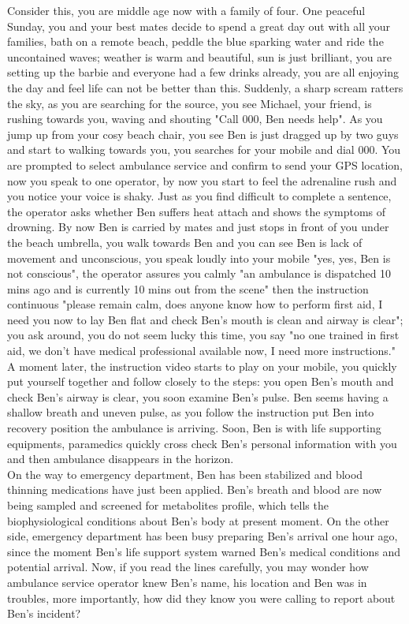 Consider this, you are middle age now with a family of four. One peaceful Sunday, you and your best mates decide to spend a great day out with all your families, bath on a remote beach, peddle the blue sparking water and ride the uncontained waves; weather is warm and beautiful, sun is just brilliant, you are setting up the barbie and everyone had a few drinks already, you are all enjoying the day and feel life can not be better than this. Suddenly, a sharp scream ratters the sky, as you are searching for the source, you see Michael, your friend, is rushing towards you, waving and shouting "Call 000, Ben needs help". As you jump up from your cosy beach chair, you see Ben is just dragged up by two guys and start to walking towards you, you searches for your mobile and dial 000. You are prompted to select ambulance service and confirm to send your GPS location, now you speak to one operator, by now you start to feel the adrenaline rush and you notice your voice is shaky. Just as you find difficult to complete a sentence, the operator asks whether Ben suffers heat attach and shows the symptoms of drowning. By now Ben is carried by mates and just stops in front of you under the beach umbrella, you walk towards Ben and you can see Ben is lack of movement and unconscious, you speak loudly into your mobile "yes, yes, Ben is not conscious", the operator assures you calmly "an ambulance is dispatched 10 mins ago and is currently 10 mins out from the scene" then the instruction continuous "please remain calm, does anyone know how to perform first aid, I need you now to lay Ben flat and check Ben's mouth is clean and airway is clear"; you ask around, you do not seem lucky this time, you say "no one trained in first aid, we don't have medical professional available now, I need more instructions." \\
A moment later, the instruction video starts to play on your mobile, you quickly put yourself together and follow closely to the steps: you open Ben's mouth and check Ben's airway is clear, you soon examine Ben's pulse. Ben seems having a shallow breath and uneven pulse, as you follow the instruction put Ben into recovery position the ambulance is arriving. Soon, Ben is with life supporting equipments, paramedics quickly cross check Ben's personal information with you and then ambulance disappears in the horizon. \\
On the way to emergency department, Ben has been stabilized and blood thinning medications have just been applied. Ben's breath and blood are now being sampled and screened for metabolites profile, which tells the biophysiological conditions about Ben's body at present moment. On the other side, emergency department has been busy preparing Ben's arrival one hour ago, since the moment Ben's life support system warned Ben's medical conditions and potential arrival. Now, if you read the lines carefully, you may wonder how ambulance service operator knew Ben's name, his location and Ben was in troubles, more importantly, how did they know you were calling to report about Ben's incident?  \\
